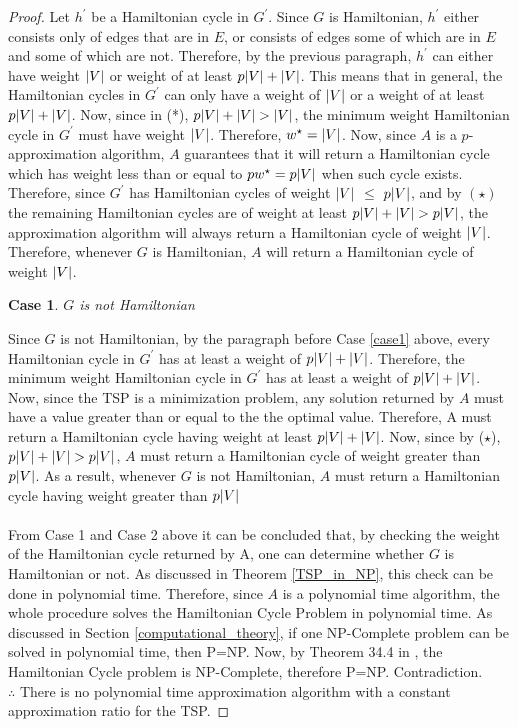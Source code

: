 \documentclass[12pt]{article}
\newtheorem{case}{Case}
\numberwithin{equation}{subsection}
\numberwithin{table}{subsection}
\numberwithin{algorithm}{subsection}
\begin{document}
\begin{proof}
Let $h^\prime$ be a Hamiltonian cycle in $G^\prime$. Since $G$ is Hamiltonian, $h^\prime$ either consists only of edges that are in $E$, or consists of edges some of which are in $E$ and some of which are not. Therefore, by the previous paragraph, $h^\prime$ can either have weight $\abs{V}$ or weight of at least $p\abs{V} + \abs{V}$. This means that in general, the Hamiltonian cycles in $G^\prime$ can only have a weight of $\abs{V}$ or a weight of at least $p\abs{V} + \abs{V}$. Now, since in (*), $p\abs{V} + \abs{V} > \abs{V}$, the minimum weight Hamiltonian cycle in $G^\prime$ must have weight $\abs{V}$. Therefore, $w^\star = \abs{V}$. Now, since $A$ is a $p$-approximation algorithm, $A$ guarantees that it will return a Hamiltonian cycle which has weight less than or equal to $pw^\star = p\abs{V}$ when such cycle exists. Therefore, since $G^\prime$ has Hamiltonian cycles of weight $\abs{V}$ $\leq$ $p\abs{V}$, and by $(\star)$ the remaining Hamiltonian cycles are of weight at least $ p\abs{V} + \abs{V} > p\abs{V}$, the approximation algorithm will always return a Hamiltonian cycle of weight $\abs{V}$. Therefore, whenever $G$ is Hamiltonian, $A$ will return a Hamiltonian cycle of weight $\abs{V}$.
\begin{case}
$G$ is not Hamiltonian
\end{case}
Since $G$ is not Hamiltonian, by the paragraph before Case \ref{case1} above, every Hamiltonian cycle in $G^\prime$ has at least a weight of $p\abs{V} + \abs{V}$. Therefore, the minimum weight Hamiltonian cycle in $G^\prime$ has at least a weight of $p\abs{V} + \abs{V}$. Now, since the TSP is a minimization problem, any solution returned by $A$ must have a value greater than or equal to the the optimal value. Therefore, A must return a Hamiltonian cycle having weight at least $p\abs{V} + \abs{V}$. Now, since by ($\star$), $p\abs{V} + \abs{V} > p\abs{V}$, $A$ must return a Hamiltonian cycle of weight greater than $p\abs{V}$. As a result, whenever $G$ is not Hamiltonian, $A$ must return a Hamiltonian cycle having weight greater than $p\abs{V}$ \\\\
From Case 1 and Case 2 above it can be concluded that, by checking the weight of the Hamiltonian cycle returned by A, one can determine whether $G$ is Hamiltonian or not. As discussed in Theorem \ref{TSP_in_NP}, this check can be done in polynomial time. Therefore, since $A$ is a polynomial time algorithm, the whole procedure solves the Hamiltonian Cycle Problem in polynomial time. As discussed in Section \ref{computational_theory}, if one NP-Complete problem can be solved in polynomial time, then P=NP. Now, by Theorem 34.4 in \cite{cormen_leiserson_rivest_stein}, the Hamiltonian Cycle problem is NP-Complete, therefore P=NP. Contradiction. \\
$\therefore$ There is no polynomial time approximation algorithm with a constant approximation ratio for the TSP.
\end{proof}
\end{document}

